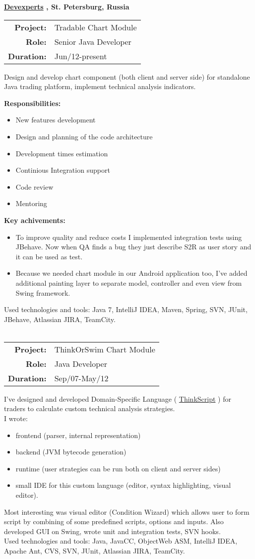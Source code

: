 \documentclass[margin,15pt]{res} %
\newcommand{\gli}[2] {
  {\color{Blue} \href{#1}{#2}}
}
\newcommand{\wsum}[3] {
\begin{tabular}{ r l }
\bf Project: & #1 \\
\bf Role: & #2 \\
\bf Duration: & #3  \\
\end{tabular}
}
\begin{document}
\begin{resume}
{\bf \gli{http://www.devexperts.com/en/index.html}{Devexperts}, St. Petersburg, Russia} \\
\wsum{Tradable Chart Module}{Senior Java Developer}{Jun/12-present}

Design and develop chart component (both client and server side) for standalone Java trading platform, implement technical analysis indicators. 

{\bf Responsibilities:} 
\begin{itemize}
  \item New features development
  \item Design and planning of the code architecture
  \item Development times estimation
  \item Continious Integration support
  \item Code review
  \item Mentoring
\end{itemize}

{\bf Key achivements: }
\begin{itemize}
  \item To improve quality and reduce costs I implemented integration tests using JBehave. Now when QA finds a bug they just describe S2R as user story and it can be used as test.
  \item Because we needed chart module in our Android application too, I've added additional painting layer to separate model, controller and even view from Swing framework.
\end{itemize}
Used technologies and tools: Java 7, IntelliJ IDEA, Maven, Spring, SVN, JUnit, \\ JBehave, Atlassian JIRA, TeamCity. \\ \\
\wsum{ThinkOrSwim Chart Module}{Java Developer}{Sep/07-May/12}

  I've designed and developed Domain-Specific Language (\gli{http://team.thinkorswim.com/manual/dark/thinkscript/index.html}{ThinkScript}) for traders to calculate custom technical analysis strategies. \\
I wrote:
\begin{itemize} 
\item frontend (parser, internal representation)
\item backend (JVM bytecode generation)
\item runtime (user strategies can be run both on client and server sides)
\item small IDE for this custom language (editor, syntax highlighting, visual editor).
\end{itemize}
 Most interesting was visual editor (Condition Wizard) which allows user to form script by combining of some predefined scripts, options and inputs.
 Also developed GUI on Swing, wrote unit and integration tests, SVN hooks. \\ 
Used technologies and tools: Java, JavaCC, ObjectWeb ASM, IntelliJ IDEA, Apache Ant, CVS, SVN, JUnit, Atlassian JIRA, TeamCity.


\end{resume}
\end{document}
